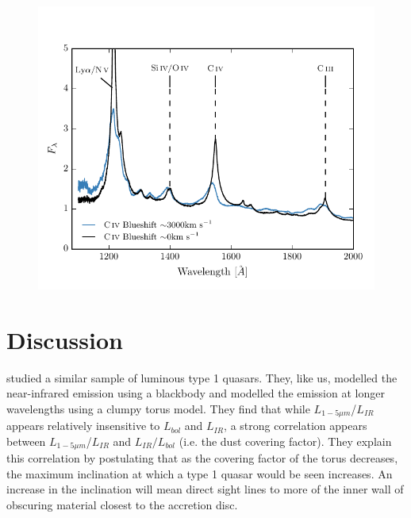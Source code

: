 \begin{figure}
\centering
  \includegraphics[width=\columnwidth]{figures/chapter05/blueshift_composite.pdf}
\caption{}
  \label{fig:blueshift_composite}
\end{figure}

\section{Discussion}

\citet{roseboom13} studied a similar sample of luminous type 1 quasars. 
They, like us, modelled the near-infrared emission using a blackbody and modelled the emission at longer wavelengths using a clumpy torus model. 
They find that while $L_{1-5\mu m}$/$L_{IR}$ appears relatively insensitive to $L_{bol}$ and $L_{IR}$, a strong correlation appears between $L_{1-5\mu m}$/$L_{IR}$ and $L_{IR}/L_{bol}$ (i.e. the dust covering factor). 
They explain this correlation by postulating that as the covering factor of the torus decreases, the maximum inclination at which a type 1 quasar would be seen increases. 
An increase in the inclination will mean direct sight lines to more of the inner wall of obscuring material closest to the accretion disc.

